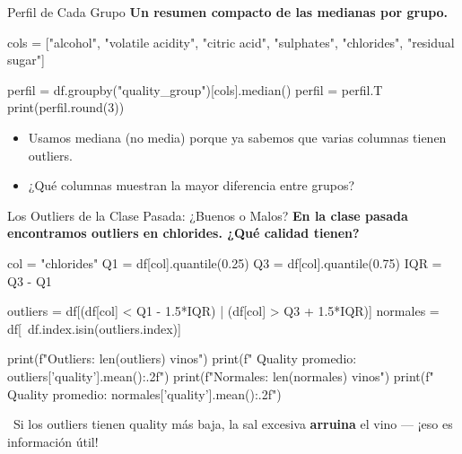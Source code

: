 \documentclass[aspectratio=169, 11pt]{beamer}
\begin{document}
\begin{frame}[fragile,shrink=28]{Perfil de Cada Grupo}
  \vspace{-6pt}
  {\footnotesize\color{arcaDark}\bfseries
    Un resumen compacto de las medianas por grupo.}

  \vspace{4pt}
  \begin{pyblock}
cols = ["alcohol", "volatile acidity", "citric acid",
        "sulphates", "chlorides", "residual sugar"]

perfil = df.groupby("quality_group")[cols].median()
perfil = perfil.T
print(perfil.round(3))
  \end{pyblock}

  \vspace{4pt}
  {\scriptsize\color{textMuted}
  \begin{itemize}\setlength{\itemsep}{3pt}
    \item[{\color{codeGreen}\scriptsize\faArrowRight}]
      Usamos mediana (no media) porque ya sabemos que
      varias columnas tienen outliers.
    \item[{\color{arcaRed}\scriptsize\faArrowRight}]
      ¿Qué columnas muestran la mayor diferencia entre grupos?
  \end{itemize}
  }
\end{frame}

\begin{frame}[fragile,shrink=28]{Los Outliers de la Clase Pasada: ¿Buenos o Malos?}
  \vspace{-6pt}
  {\footnotesize\color{arcaDark}\bfseries
    En la clase pasada encontramos outliers en chlorides. ¿Qué calidad tienen?}

  \vspace{4pt}
  \begin{pyblock}
col = "chlorides"
Q1 = df[col].quantile(0.25)
Q3 = df[col].quantile(0.75)
IQR = Q3 - Q1

outliers = df[(df[col] < Q1 - 1.5*IQR) |
              (df[col] > Q3 + 1.5*IQR)]
normales = df[~df.index.isin(outliers.index)]

print(f"Outliers: {len(outliers)} vinos")
print(f"  Quality promedio: {outliers['quality'].mean():.2f}")
print(f"Normales: {len(normales)} vinos")
print(f"  Quality promedio: {normales['quality'].mean():.2f}")
  \end{pyblock}

  \vspace{4pt}
  {\scriptsize\color{textMuted}
    \faLightbulb\ Si los outliers tienen quality más baja,
    la sal excesiva \textbf{arruina} el vino --- ¡eso es información útil!}
\end{frame}
\end{document}
